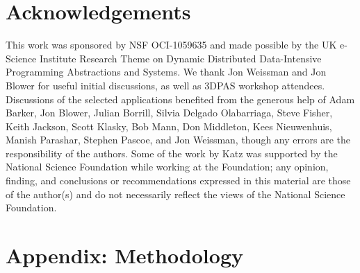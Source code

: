 




\section*{Acknowledgements}
This work was sponsored by NSF OCI-1059635 and made possible by the UK e-Science
Institute Research Theme on Dynamic Distributed Data-Intensive Programming
Abstractions and Systems. We thank Jon Weissman and Jon Blower for useful
initial discussions, as well as 3DPAS workshop attendees. Discussions of the
selected applications benefited from the generous help of Adam Barker, Jon
Blower, Julian Borrill, Silvia Delgado Olabarriaga, Steve Fisher, Keith Jackson,
Scott Klasky, Bob Mann, Don Middleton, Kees Nieuwenhuis, Manish Parashar,
Stephen Pascoe, and Jon Weissman, though any errors are the responsibility of
the authors.  Some of the work by Katz was supported by the National Science
Foundation while working at the Foundation; any opinion, finding, and
conclusions or recommendations expressed in this material are those of the
author(s) and do not necessarily reflect the views of the National Science
Foundation.




\appendix
\section*{Appendix: Methodology}

